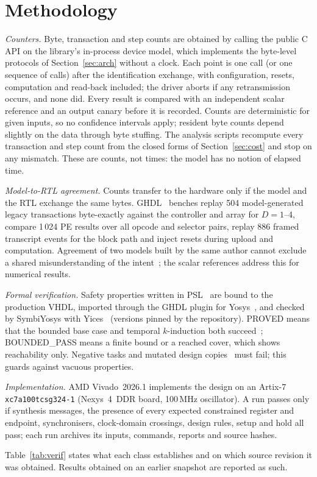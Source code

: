 \section{Methodology}
\label{sec:method}

\emph{Counters.} Byte, transaction and step counts are obtained by calling
the public C API on the library's in-process device model, which implements
the byte-level protocols of Section~\ref{sec:arch} without a clock. Each
point is one call (or one sequence of calls) after the identification
exchange, with configuration, resets, computation and read-back included; the
driver aborts if any retransmission occurs, and none did. Every result is compared
with an independent scalar reference and an output canary before it is
recorded. Counts are deterministic for given inputs, so no confidence
intervals apply; resident byte counts depend slightly on the data through
byte stuffing. The analysis scripts recompute every transaction and step
count from the closed forms of Section~\ref{sec:cost} and stop on any
mismatch. These are counts, not times: the model has no notion of elapsed
time.

\emph{Model-to-RTL agreement.} Counts transfer to the hardware only if the
model and the RTL exchange the same bytes. GHDL~\cite{ghdl} benches replay
504 model-generated legacy transactions byte-exactly against the controller
and array for $D=1$--4, compare 1\,024 PE results over all opcode and
selector pairs, replay 886 framed transcript events for the block path and
inject resets during upload and computation. Agreement of two models built
by the same author cannot exclude a shared misunderstanding of the
intent~\cite{mckeeman-differential}; the scalar references address this
for numerical results.

\emph{Formal verification.} Safety properties written in PSL~\cite{psl}
are bound to the production VHDL, imported through the GHDL plugin for
Yosys~\cite{yosys}, and checked by SymbiYosys with
Yices~\cite{yices} (versions pinned by the repository). PROVED means that
the bounded base case and temporal $k$-induction both
succeed~\cite{biere-bmc,kinduction}; BOUNDED\_PASS means a finite bound or a
reached cover, which shows reachability only. Negative tasks and mutated
design copies~\cite{demillo-mutation} must fail; this guards against
vacuous properties.

\emph{Implementation.} AMD Vivado~2026.1 implements the design on an
Artix-7 \texttt{xc7a100tcsg324-1} (Nexys~4~DDR board, 100\,MHz oscillator).
A run passes only if synthesis messages, the presence of every expected
constrained register and endpoint, synchronisers, clock-domain crossings,
design rules, setup and hold all pass; each run archives its inputs,
commands, reports and source hashes.

Table~\ref{tab:verif} states what each class establishes and on which
source revision it was obtained. Results obtained on an earlier snapshot are
reported as such.


